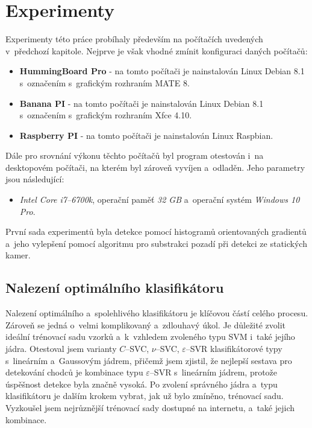 \section{Experimenty}

Experimenty této práce probíhaly především na počítačích uvedených v~předchozí kapitole. Nejprve je však vhodné zmínit konfiguraci daných počítačů:
\begin{itemize}
\item\textbf{HummingBoard Pro} - na tomto počítači je nainstalován Linux Debian 8.1 s~označením  s~grafickým rozhraním MATE 8.
\item\textbf{Banana PI} - na tomto počítači je nainstalován Linux Debian 8.1 s~označením  s~grafickým rozhraním Xfce 4.10. 
\item\textbf{Raspberry PI} - na tomto počítači je nainstalován Linux Raspbian. 
\end{itemize}
Dále pro srovnání výkonu těchto počítačů byl program otestován i~na desktopovém počítači, na kterém byl zároveň vyvíjen a~odladěn. Jeho parametry jsou následující: 
\begin{itemize}
\item\textit{Intel Core i7--6700k}, operační paměť  \textit{32 GB} a~operační systém  \textit{Windows 10 Pro}.
\end{itemize}
První sada experimentů byla detekce pomocí histogramů orientovaných gradientů a~jeho vylepšení pomocí algoritmu pro substrakci pozadí při detekci ze statických kamer.

\subsection{Nalezení optimálního klasifikátoru}

Nalezení optimálního a~spolehlivého klasifikátoru je klíčovou částí celého procesu. Zároveň se jedná o~velmi komplikovaný a~zdlouhavý úkol. Je důležité zvolit ideální trénovací sadu vzorků a~k~vzhledem zvoleného typu SVM i~také jejího jádra. Otestoval jsem varianty $C$--SVC, $\nu$--SVC, $\varepsilon$--SVR klasifikátorové typy s~lineárním a~Gaussovým jádrem, přičemž jsem zjistil, že nejlepší sestava pro detekování chodců je kombinace 
typu $\varepsilon$--SVR s~lineárním jádrem, protože úspěšnost detekce byla značně vysoká. Po zvolení správného jádra a~typu klasifikátoru je dalším krokem vybrat, jak už bylo zmíněno, trénovací sadu. Vyzkoušel jsem nejrůznější trénovací sady dostupné na internetu, a~také jejich kombinace.

